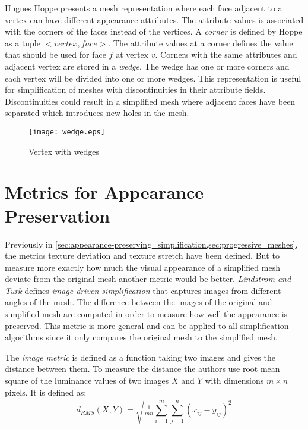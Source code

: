 Hugues Hoppe \cite{hoppe1998efficient} presents a mesh representation where each face adjacent to a vertex can have different appearance attributes. The attribute values is associated with the corners of the faces instead of the vertices. A \emph{corner} is defined by Hoppe as a tuple $<vertex,face>$. The attribute values at a corner defines the value that should be used for face $f$ at vertex $v$. Corners with the same attributes and adjacent vertex are stored in a \emph{wedge}. The wedge has one or more corners and each vertex will be divided into one or more wedges. This representation is useful for simplification of meshes with discontinuities in their attribute fields. Discontinuities could result in a simplified mesh where adjacent faces have been separated which introduces new holes in the mesh.

\begin{figure}[ht]
    \centering
    \texttt{[image: wedge.eps]}
    \caption{Vertex with wedges}
    \label{fig:wedge}
\end{figure}

\section{Metrics for Appearance Preservation} \label{sec:metrics_for_appearance_preservation}
Previously in \cref{sec:appearance-preserving_simplification,sec:progressive_meshes}, the metrics texture deviation and texture stretch have been defined. But to measure more exactly how much the visual appearance of a simplified mesh deviate from the original mesh another metric would be better. \emph{Lindstrom and Turk} \cite{lindstrom2000image} defines \emph{image-driven simplification} that captures images from different angles of the mesh. The difference between the images of the original and simplified mesh are computed in order to measure how well the appearance is preserved. This metric is more general and can be applied to all simplification algorithms since it only compares the original mesh to the simplified mesh.

The \emph{image metric} is defined as a function taking two images and gives the distance between them. To measure the distance the authors use root mean square of the luminance values of two images $X$ and $Y$ with dimensions $m \times n$ pixels. It is defined as:
\begin{equation} \label{eq:rms_images}
  d_{RMS}(X,Y) = \sqrt{\tfrac{1}{mn}\sum^m_{i=1}\sum^n_{j=1}(x_{ij} - y_{ij})^2}
\end{equation}


